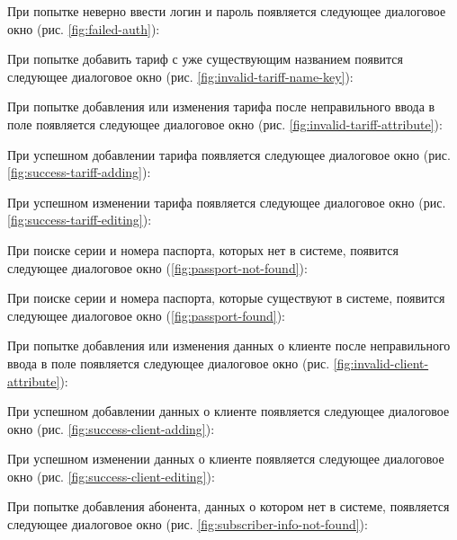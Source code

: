 При попытке неверно ввести логин и пароль появляется следующее диалоговое окно (рис. \ref{fig:failed-auth}):

При попытке добавить тариф с уже существующим названием появится следующее диалоговое окно (рис. \ref{fig:invalid-tariff-name-key}):

При попытке добавления или изменения тарифа после неправильного ввода в поле появляется следующее диалоговое окно (рис. \ref{fig:invalid-tariff-attribute}):

При успешном добавлении тарифа появляется следующее диалоговое окно (рис. \ref{fig:success-tariff-adding}):

При успешном изменении тарифа появляется следующее диалоговое окно (рис. \ref{fig:success-tariff-editing}):

При поиске серии и номера паспорта, которых нет в системе, появится следующее диалоговое окно (\ref{fig:passport-not-found}):

При поиске серии и номера паспорта, которые существуют в системе, появится следующее диалоговое окно (\ref{fig:passport-found}):

При попытке добавления или изменения данных о клиенте после неправильного ввода в поле появляется следующее диалоговое окно (рис. \ref{fig:invalid-client-attribute}):

При успешном добавлении данных о клиенте появляется следующее диалоговое окно (рис. \ref{fig:success-client-adding}):

При успешном изменении данных о клиенте появляется следующее диалоговое окно (рис. \ref{fig:success-client-editing}):

При попытке добавления абонента, данных о котором нет в системе, появляется следующее диалоговое окно (рис. \ref{fig:subscriber-info-not-found}):

